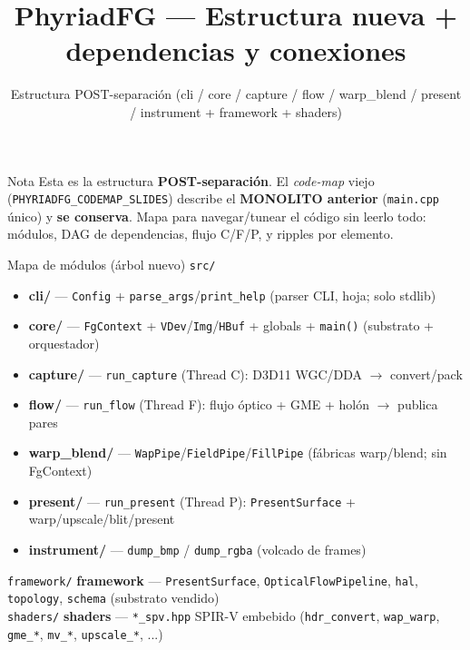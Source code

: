 \documentclass[aspectratio=169]{beamer}
\title{PhyriadFG --- Estructura nueva + dependencias y conexiones}
\subtitle{Estructura POST-separaci\'on (cli / core / capture / flow / warp\_blend / present / instrument + framework + shaders)}
\date{}
\author{}
\newcommand{\arr}{\ensuremath{\rightarrow}}
\newcommand{\Lcli}[1]{\textcolor{cliCol}{\textbf{#1}}}
\newcommand{\Lcore}[1]{\textcolor{coreCol}{\textbf{#1}}}
\newcommand{\Lcap}[1]{\textcolor{capCol}{\textbf{#1}}}
\newcommand{\Lflow}[1]{\textcolor{flowCol}{\textbf{#1}}}
\newcommand{\Lwarp}[1]{\textcolor{warpCol}{\textbf{#1}}}
\newcommand{\Lpres}[1]{\textcolor{presCol}{\textbf{#1}}}
\newcommand{\Linst}[1]{\textcolor{instCol}{\textbf{#1}}}
\newcommand{\Lfw}[1]{\textcolor{fwCol}{\textbf{#1}}}
\newcommand{\Lshd}[1]{\textcolor{shCol}{\textbf{#1}}}
\begin{document}
\begin{frame}[plain]
  \titlepage
  \begin{block}{\small Nota}
    \scriptsize Esta es la estructura \textbf{POST-separaci\'on}. El \emph{code-map} viejo
    (\texttt{PHYRIADFG\_CODEMAP\_SLIDES}) describe el \textbf{MONOLITO anterior} (\texttt{main.cpp} \'unico)
    y \textbf{se conserva}. Mapa para navegar/tunear el c\'odigo sin leerlo todo: m\'odulos, DAG de
    dependencias, flujo C/F/P, y ripples por elemento.
  \end{block}
\end{frame}

\begin{frame}{Mapa de m\'odulos (\'arbol nuevo)}
\small
\texttt{src/}
\begin{itemize}\setlength\itemsep{1pt}
  \item[] \Lcli{cli/} --- \texttt{Config} + \texttt{parse\_args}/\texttt{print\_help} (parser CLI, hoja; solo stdlib)
  \item[] \Lcore{core/} --- \texttt{FgContext} + \texttt{VDev}/\texttt{Img}/\texttt{HBuf} + globals + \texttt{main()} (substrato + orquestador)
  \item[] \Lcap{capture/} --- \texttt{run\_capture} (Thread C): D3D11 WGC/DDA \arr{} convert/pack
  \item[] \Lflow{flow/} --- \texttt{run\_flow} (Thread F): flujo \'optico + GME + hol\'on \arr{} publica pares
  \item[] \Lwarp{warp\_blend/} --- \texttt{WapPipe}/\texttt{FieldPipe}/\texttt{FillPipe} (f\'abricas warp/blend; sin FgContext)
  \item[] \Lpres{present/} --- \texttt{run\_present} (Thread P): \texttt{PresentSurface} + warp/upscale/blit/present
  \item[] \Linst{instrument/} --- \texttt{dump\_bmp} / \texttt{dump\_rgba} (volcado de frames)
\end{itemize}
\texttt{framework/} \quad \Lfw{framework} --- \texttt{PresentSurface}, \texttt{OpticalFlowPipeline}, \texttt{hal}, \texttt{topology}, \texttt{schema} (substrato vendido)\\[2pt]
\texttt{shaders/} \quad\;\; \Lshd{shaders} --- \texttt{*\_spv.hpp} SPIR-V embebido (\texttt{hdr\_convert}, \texttt{wap\_warp}, \texttt{gme\_*}, \texttt{mv\_*}, \texttt{upscale\_*}, ...)
\end{frame}
\end{document}
